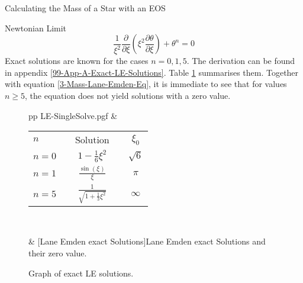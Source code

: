 \begin{section}{Calculating the Mass of a Star with an EOS}
\begin{subsection}{Newtonian Limit}
\begin{equation}
	\frac{1}{\xi^2}\frac{\partial}{\partial\xi}\left(\xi^2\frac{\partial\theta}{\partial\xi}\right) + \theta^n=0 \label{3-Mass-Lane-Emden-Eq}
\end{equation}
Exact solutions are known for the cases $n=0,1,5$. The derivation can be found in appendix \ref{99-App-A-Exact-LE-Solutions}. Table \ref{3-Mass-LE-Exact-Results} summarises them. Together with equation \ref{3-Mass-Lane-Emden-Eq}, it is immediate to see that for values $n\geq5$, the equation does not yield solutions with a zero value.
\begin{figure}[H]
	\centering
	\begin{tabular}{p{\dimexpr 8cm}p{\dimexpr {}\tabcolsep-8cm}}
		{LE-SingleSolve.pgf}
		&
		\renewcommand{\arraystretch}{1.2}
		\begin{tabular}[b]{@{}lcccc@{}}
			\toprule
			$n$ & \phantom{abcd} & Solution & \phantom{abcd} & $\xi_0$\\
			\cmidrule{1-5}
			$n=0$ && $\displaystyle 1-\frac{1}{6}\xi^2$ && $\sqrt{6}$\\[3ex]
			$n=1$ && $\displaystyle \frac{\sin(\xi)}{\xi}$ && $\pi$\\[3ex]
			$n=5$ && $\displaystyle \frac{1}{\sqrt{1+\frac{1}{3}\xi^2}}$ && $\infty$\\[2ex]
			\bottomrule
		\end{tabular}\\
		\caption[Lane Emden exact Solutions]{Graph of exact LE solutions.}
		\label{3-Mass-LE-Exact-Results-Plots}
		&
		[Lane Emden exact Solutions]{Lane Emden exact Solutions and their zero value.}
		\label{3-Mass-LE-Exact-Results}
	\end{tabular}
\end{figure}


\end{subsection}
\end{section}
